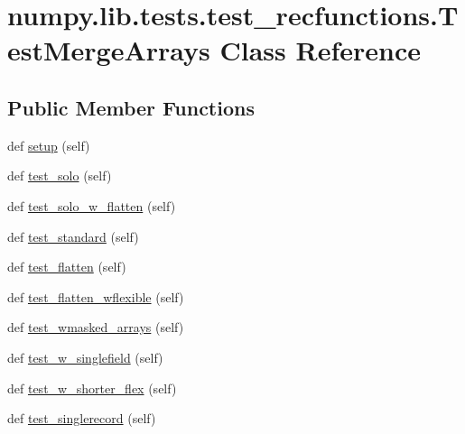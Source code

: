 \hypertarget{classnumpy_1_1lib_1_1tests_1_1test__recfunctions_1_1TestMergeArrays}{}\section{numpy.\+lib.\+tests.\+test\+\_\+recfunctions.\+Test\+Merge\+Arrays Class Reference}
\label{classnumpy_1_1lib_1_1tests_1_1test__recfunctions_1_1TestMergeArrays}
\subsection*{Public Member Functions}
\begin{DoxyCompactItemize}
\item 
def \hyperlink{classnumpy_1_1lib_1_1tests_1_1test__recfunctions_1_1TestMergeArrays_a4bfe1c871f4dbd791439fe7644e01971}{setup} (self)
\item 
def \hyperlink{classnumpy_1_1lib_1_1tests_1_1test__recfunctions_1_1TestMergeArrays_aaea0e5888a48abfabfda00f51dfaedab}{test\+\_\+solo} (self)
\item 
def \hyperlink{classnumpy_1_1lib_1_1tests_1_1test__recfunctions_1_1TestMergeArrays_a734731af4c2503c8cc2e714f4feb2721}{test\+\_\+solo\+\_\+w\+\_\+flatten} (self)
\item 
def \hyperlink{classnumpy_1_1lib_1_1tests_1_1test__recfunctions_1_1TestMergeArrays_a7df67bc0f6949529c3131e8b15146e20}{test\+\_\+standard} (self)
\item 
def \hyperlink{classnumpy_1_1lib_1_1tests_1_1test__recfunctions_1_1TestMergeArrays_a15c7c4d50f68f52a08ca2dd4f957a15f}{test\+\_\+flatten} (self)
\item 
def \hyperlink{classnumpy_1_1lib_1_1tests_1_1test__recfunctions_1_1TestMergeArrays_ae7d4b84734fafd97b8a504553f69674c}{test\+\_\+flatten\+\_\+wflexible} (self)
\item 
def \hyperlink{classnumpy_1_1lib_1_1tests_1_1test__recfunctions_1_1TestMergeArrays_a5fa460e9269ed13e1d76a521e24e1104}{test\+\_\+wmasked\+\_\+arrays} (self)
\item 
def \hyperlink{classnumpy_1_1lib_1_1tests_1_1test__recfunctions_1_1TestMergeArrays_a395789754326b12132e06feb5ea79204}{test\+\_\+w\+\_\+singlefield} (self)
\item 
def \hyperlink{classnumpy_1_1lib_1_1tests_1_1test__recfunctions_1_1TestMergeArrays_afa99cfaaf9fa23f92806e3e8ab17f39b}{test\+\_\+w\+\_\+shorter\+\_\+flex} (self)
\item 
def \hyperlink{classnumpy_1_1lib_1_1tests_1_1test__recfunctions_1_1TestMergeArrays_aa2f8a3023e0895d4f00b9b750d82cad9}{test\+\_\+singlerecord} (self)
\end{DoxyCompactItemize}
